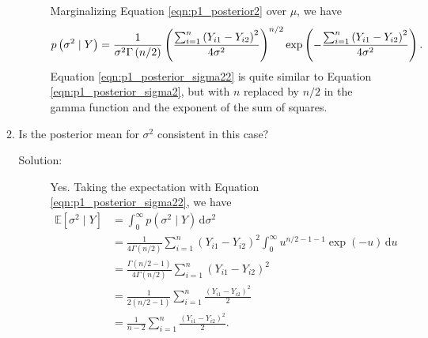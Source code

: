 \documentclass[letterpaper,11pt]{article}
\begin{document}
\begin{enumerate}
\begin{enumerate}
\begin{description}
        Marginalizing Equation \ref{eqn:p1_posterior2} over $\mu$, we have
        \begin{equation}
          \scriptsize
          p\left(\sigma^2 \mid Y\right)
          = \frac{1}{\sigma^2\Gamma\left(n/2\right)}
          \left(\frac{\sum_{i=1}^n \left(Y_{i1} - Y_{i2}\right)^2}{4\sigma^2}\right)^{n/2}
          \exp\left(-\frac{\sum_{i=1}^n \left(Y_{i1} - Y_{i2}\right)^2}{4\sigma^2}\right).
          \label{eqn:p1_posterior_sigma22}
        \end{equation}
        Equation \ref{eqn:p1_posterior_sigma22} is quite similar to Equation
        \ref{eqn:p1_posterior_sigma2}, but with $n$ replaced by $n/2$ in the
        gamma function and the exponent of the sum of squares.        
      \end{description}
    \item Is the posterior mean for $\sigma^2$ consistent in this case?
      \begin{description}
      \item[Solution:] Yes. Taking the expectation with Equation
        \ref{eqn:p1_posterior_sigma22}, we have
        \begin{align}
          \mathbb{E}\left[\sigma^2 \mid Y\right]
          &= \int_0^\infty p\left(\sigma^2 \mid Y\right)\,\mathrm{d}\sigma^2\nonumber\\
          &= \frac{1}{4\Gamma\left(n/2\right)}\sum_{i=1}^n \left(Y_{i1} - Y_{i2}\right)^2
            \int_0^\infty  u^{n/2 - 1 - 1}\exp\left(-u\right)\,\mathrm{d}u
            \nonumber\\
          &= \frac{\Gamma\left(n/2 - 1\right)}{4\Gamma\left(n/2\right)}\sum_{i=1}^n \left(Y_{i1} - Y_{i2}\right)^2
            \nonumber\\
          &= \frac{1}{2\left(n/2 - 1\right)}\sum_{i=1}^n \frac{\left(Y_{i1} - Y_{i2}\right)^2}{2} \nonumber\\
          &= \frac{1}{n-2}\sum_{i=1}^n \frac{\left(Y_{i1} - Y_{i2}\right)^2}{2}.
            \label{eqn:p1_posterior_sigma2_expectation2}
        \end{align}


\end{description}
\end{enumerate}
\end{enumerate}
\end{document}
